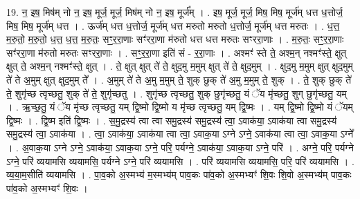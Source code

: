 \documentclass[17pt]{extarticle}
\begin{document}
19. न॒ इष॒ मिष॑म् नो न॒ इष॒ मूर्ज॒ मूर्ज॒ मिष॑म् नो न॒ इष॒ मूर्ज᳚म् । . इष॒ मूर्ज॒ मूर्ज॒ मिष॒ मिष॒ मूर्ज॑म् धत्त ध॒त्तोर्ज॒ मिष॒ मिष॒ मूर्ज॑म् धत्त । . ऊर्ज॑म् धत्त ध॒त्तोर्ज॒ मूर्ज॑म् धत्त मरुतो मरुतो ध॒त्तोर्ज॒ मूर्ज॑म् धत्त मरुतः । . ध॒त्त॒ म॒रु॒तो॒ म॒रु॒तो॒ ध॒त्त॒ ध॒त्त॒ म॒रु॒तः॒ सꣳ॒॒र॒रा॒णाः सꣳ॑ररा॒णा म॑रुतो धत्त धत्त मरुतः सꣳररा॒णाः । . म॒रु॒तः॒ सꣳ॒॒र॒रा॒णाः सꣳ॑ररा॒णा म॑रुतो मरुतः सꣳररा॒णाः । . सꣳ॒॒र॒रा॒णा इति॑ सं - र॒रा॒णाः । . अश्मꣳ॑ स्ते ते॒ अश्म॒न् नश्मꣳ॑स्ते॒ क्षुत् क्षुत् ते॒ अश्म॒न् नश्मꣳ॑स्ते॒ क्षुत् । . ते॒ क्षुत् क्षुत् ते॑ ते॒ क्षुद॒मु म॒मुम् क्षुत् ते॑ ते॒ क्षुद॒मुम् । . क्षुद॒मु म॒मुम् क्षुत् क्षुद॒मुम् ते॑ ते अ॒मुम् क्षुत् क्षुद॒मुम् ते᳚ । . अ॒मुम् ते॑ ते अ॒मु म॒मुम् ते॒ शुक् छुक् ते॑ अ॒मु म॒मुम् ते॒ शुक् । . ते॒ शुक् छुक् ते॑ ते॒ शुगृ॑च्छ त्वृच्छतु॒ शुक् ते॑ ते॒ शुगृ॑च्छतु । . शुगृ॑च्छ त्वृच्छतु॒ शुक् छुगृ॑च्छतु॒ यं ॅय मृ॑च्छतु॒ शुग् छुगृ॑च्छतु॒ यम् । . ऋ॒च्छ॒तु॒ यं ॅय मृ॑च्छ त्वृच्छतु॒ यम् द्वि॒ष्मो द्वि॒ष्मो य मृ॑च्छ त्वृच्छतु॒ यम् द्वि॒ष्मः । . यम् द्वि॒ष्मो द्वि॒ष्मो यं ॅयम् द्वि॒ष्मः । . द्वि॒ष्म इति॑ द्वि॒ष्मः । . स॒मु॒द्रस्य॑ त्वा त्वा समु॒द्रस्य॑ समु॒द्रस्य॑ त्वा॒ ऽवाक॑या॒ ऽवाक॑या त्वा समु॒द्रस्य॑ समु॒द्रस्य॑ त्वा॒ ऽवाक॑या । . त्वा॒ ऽवाक॑या॒ ऽवाक॑या त्वा त्वा॒ ऽवाक॒या ऽग्ने ऽग्ने॒ ऽवाक॑या त्वा त्वा॒ ऽवाक॒या ऽग्ने᳚ । . अ॒वाक॒या ऽग्ने ऽग्ने॒ ऽवाक॑या॒ ऽवाक॒या ऽग्ने॒ परि॒ पर्यग्ने॒ ऽवाक॑या॒ ऽवाक॒या ऽग्ने॒ परि॑ । . अग्ने॒ परि॒ पर्यग्ने ऽग्ने॒ परि॑ व्ययामसि व्ययामसि॒ पर्यग्ने ऽग्ने॒ परि॑ व्ययामसि । . परि॑ व्ययामसि व्ययामसि॒ परि॒ परि॑ व्ययामसि । . व्य॒या॒म॒सीति॑ व्ययामसि । . पा॒व॒को अ॒स्मभ्य॑ म॒स्मभ्य॑म् पाव॒कः पा॑व॒को अ॒स्मभ्यꣳ॑ शि॒वः शि॒वो अ॒स्मभ्य॑म् पाव॒कः पा॑व॒को अ॒स्मभ्यꣳ॑ शि॒वः । \newline
\end{document}
